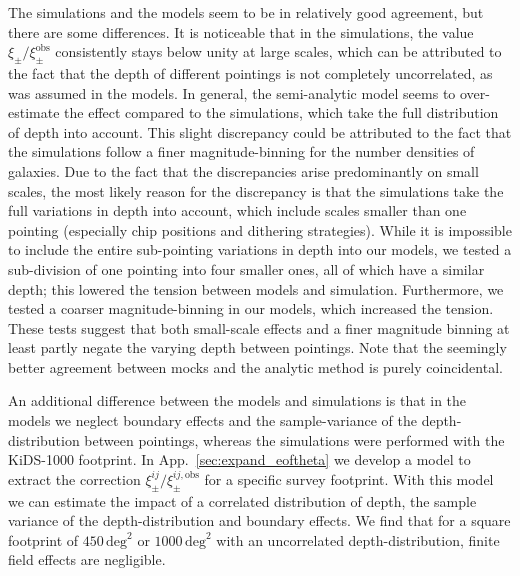 \documentclass{aa}
\renewcommand{\rm}{\mathrm}
\begin{document}
The simulations and the models seem to be in relatively good agreement, but there are some differences. It is noticeable that in the simulations, the value $\xi_\pm/\xi_\pm^{\rm{obs}}$ consistently stays below unity at large scales, which can be attributed to the fact that the depth of different pointings is not completely uncorrelated, as was assumed in the models. %
In general, the semi-analytic model seems to over-estimate the effect compared to the simulations, which take the full distribution of depth into account. This slight discrepancy could be attributed to the fact that the simulations follow a finer magnitude-binning for the number densities of galaxies. Due to the fact that the discrepancies arise predominantly on small scales, the most likely reason for the discrepancy is that the simulations take the full variations in depth into account, which include scales smaller than one pointing (especially chip positions and dithering strategies). While it is impossible to include the entire sub-pointing variations in depth into our models, we tested a sub-division of one pointing into four smaller ones, all of which have a similar depth; this lowered the tension between models and simulation. Furthermore, we tested a coarser magnitude-binning in our models, which increased the tension. These tests suggest that both small-scale effects and a finer magnitude binning at least partly negate the varying depth between pointings. Note that the seemingly better agreement between mocks and the analytic method is purely coincidental.

An additional difference between the models and simulations is that in the models we neglect boundary effects and the sample-variance of the depth-distribution between pointings, whereas the simulations were performed with the KiDS-1000 footprint. In App.~\ref{sec:expand_eoftheta} we develop a model to extract the correction $\xi_\pm^{ij}/\xi_{\pm}^{ij,\rm{obs}}$ for a specific survey footprint. With this model we can estimate the impact of a correlated distribution of depth, the sample variance of the depth-distribution and boundary effects. We find that for a square footprint of $450\,\rm{deg}^2$ or $1000\,\rm{deg}^2$ with an uncorrelated depth-distribution, finite field effects are negligible.
\end{document}
